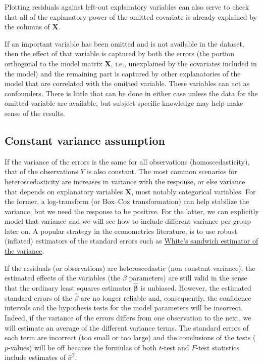 \documentclass[
  11pt,
  letterpaper,
]{scrbook}
\theoremstyle{definition}
\theoremstyle{definition}
\theoremstyle{plain}
\theoremstyle{plain}
\theoremstyle{remark}
\begin{document}
Plotting residuals against left-out explanatory variables can also serve
to check that all of the explanatory power of the omitted covariate is
already explained by the columns of \(\mathbf{X}\).

If an important variable has been omitted and is not available in the
dataset, then the effect of that variable is captured by both the errors
(the portion orthogonal to the model matrix \(\mathbf{X}\), i.e.,
unexplained by the covariates included in the model) and the remaining
part is captured by other explanatories of the model that are correlated
with the omitted variable. These variables can act as confounders. There
is little that can be done in either case unless the data for the
omitted variable are available, but subject-specific knowledge may help
make sense of the results.

\subsection{Constant variance
assumption}\label{constant-variance-assumption}

If the variance of the errors is the same for all observations
(homoscedasticity), that of the observations \(Y\) is also constant. The
most common scenarios for heteroscedasticity are increases in variance
with the response, or else variance that depends on explanatory
variables \(\mathbf{X}\), most notably categorical variables. For the
former, a log-transform (or Box--Cox transformation) can help stabilize
the variance, but we need the response to be positive. For the latter,
we can explicitly model that variance and we will see how to include
different variance per group later on. A popular strategy in the
econometrics literature, is to use robust (inflated) estimators of the
standard errors such as
\href{https://en.wikipedia.org/wiki/Heteroscedasticity-consistent_standard_errors}{White's
sandwich estimator of the variance}.

If the residuals (or observations) are heteroscedastic (non constant
variance), the estimated effects of the variables (the \(\beta\)
parameters) are still valid in the sense that the ordinary least squares
estimator \(\widehat{\boldsymbol{\beta}}\) is unbiased. However, the
estimated standard errors of the \(\widehat{\beta}\) are no longer
reliable and, consequently, the confidence intervals and the hypothesis
tests for the model parameters will be incorrect. Indeed, if the
variance of the errors differs from one observation to the next, we will
estimate an average of the different variance terms. The standard errors
of each term are incorrect (too small or too large) and the conclusions
of the tests (\(p\)-values) will be off because the formulas of both
\(t\)-test and \(F\)-test statistics include estimates of
\(\hat{\sigma}^2\).
\end{document}
